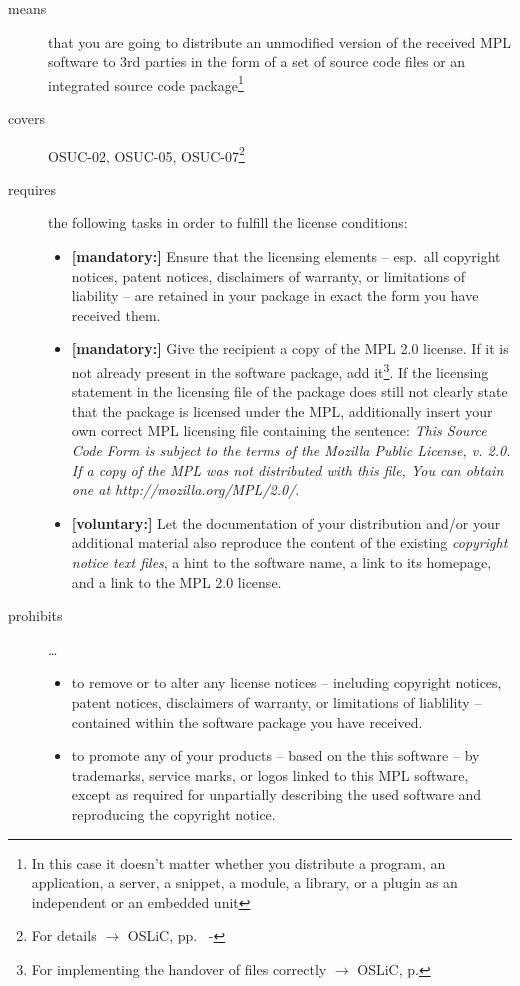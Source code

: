 \begin{description}

\item[means] that you are going to distribute an unmodified version of the
received MPL software to 3rd parties in the form of a set of source code files or
an integrated source code package\footnote{In this case it doesn't matter
whether you  distribute a program, an application, a server, a snippet, a
module, a library, or a plugin as an independent or an embedded unit}

\item[covers] OSUC-02, OSUC-05, OSUC-07\footnote{For details $\rightarrow$ OSLiC, pp.\ 
\pageref{OSUC-02-DEF} - \pageref{OSUC-07-DEF}}

\item[requires] the following tasks in order to fulfill the license conditions:
\begin{itemize}
  
  \item \textbf{[mandatory:]} Ensure that the licensing elements -- esp.\ all
  copyright notices, patent notices, disclaimers of warranty, or limitations of
  liability -- are retained in your package in exact the form you have received
  them.

  \item \textbf{[mandatory:]} Give the recipient a copy of the MPL 2.0 license.
  If it is not already present in the software package, add it\footnote{For
  implementing the handover of files correctly $\rightarrow$ OSLiC, p.
  \pageref{DistributingFilesHint}}. If the licensing statement in the licensing
  file of the package does still not clearly state that the package is licensed
  under the MPL, additionally insert your own correct MPL licensing file
  containing the sentence: \emph{This Source Code Form is subject to the terms
  of the Mozilla Public License, v. 2.0. If a copy of the MPL was not
  distributed with this file, You can obtain one at
  http://mozilla.org/MPL/2.0/}.

  \item \textbf{[voluntary:]} Let the documentation of your distribution and/or
  your additional material also reproduce the content of the existing
  \emph{copyright notice text files}, a hint to the software name, a link to its
  homepage, and a link to the MPL 2.0 license.
\end{itemize}

\item[prohibits] \ldots
\begin{itemize}
  \item to remove or to alter any license notices -- including copyright
  notices, patent notices, disclaimers of warranty, or limitations of liablility
  -- contained within the software package you have received.
  \item to promote any of your products -- based on the this software -- by
  trademarks, service marks, or logos linked to this MPL software, except as
  required for unpartially describing the used software and reproducing the
  copyright notice.
\end{itemize}
\end{description}


